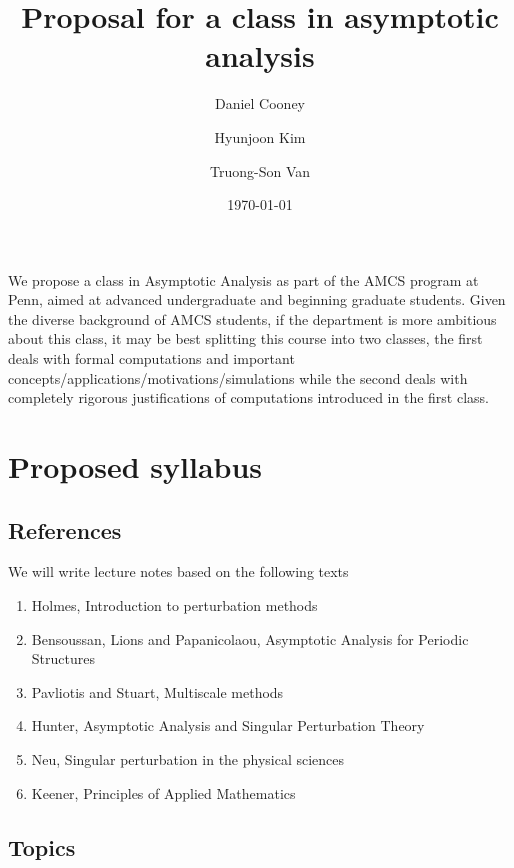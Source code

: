 \documentclass[12pt]{amsart}
\title{ Proposal for a class in asymptotic analysis }
\author{Daniel Cooney}
\author{Hyunjoon Kim}
\author{Truong-Son Van}
\date{\today}
\begin{document}
\maketitle

We propose a class in Asymptotic Analysis as part of the AMCS program at Penn,
aimed at advanced undergraduate and beginning graduate students.
Given the diverse background of AMCS students,
if the department is more ambitious about this class, it may be best splitting 
this course into two classes, the first deals with formal computations 
and important concepts/applications/motivations/simulations while the second
deals with completely rigorous justifications of computations introduced in the
first class.


\section{ Proposed syllabus}

\subsection*{References}

    We will write lecture notes based on the following texts
\begin{enumerate}
    \item Holmes, Introduction to perturbation methods~\cite{Holmes2013}
    \item Bensoussan, Lions and Papanicolaou, Asymptotic Analysis for Periodic Structures~\cite{BensoussanLionsPapanicolaou1978}
    \item Pavliotis and Stuart, Multiscale methods~\cite{PavliotisStuart2008}
    \item Hunter, Asymptotic Analysis and Singular Perturbation Theory~\cite{Hunter}
    \item Neu, Singular perturbation in the physical sciences~\cite{Neu2015}
    \item Keener, Principles of Applied Mathematics~\cite{Keener2000}
\end{enumerate}

\subsection*{Topics}
\end{document}
